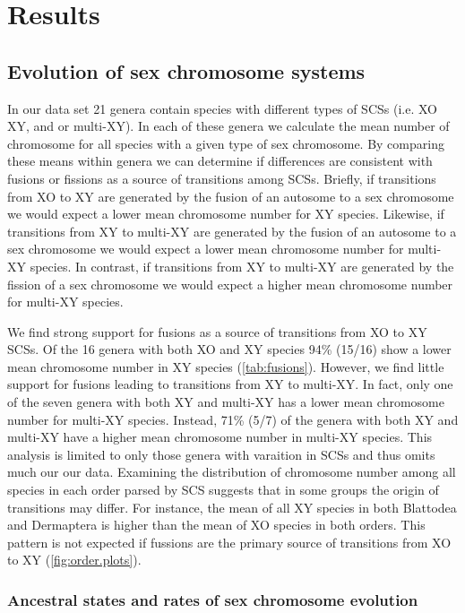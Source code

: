 \section{Results}

\subsection{Evolution of sex chromosome systems}
In our data set 21 genera contain species with different types of SCSs (i.e. XO XY, and or multi-XY).
In each of these genera we calculate the mean number of chromosome for all species with a given type of sex chromosome.
By comparing these means within genera we can determine if differences are consistent with fusions or fissions as a source of transitions among SCSs.
Briefly, if transitions from XO to XY are generated by the fusion of an autosome to a sex chromosome we would expect a lower mean chromosome number for XY species.
Likewise, if transitions from XY to multi-XY are generated by the fusion of an autosome to a sex chromosome we would expect a lower mean chromosome number for multi-XY species.
In contrast, if transitions from XY to multi-XY are generated by the fission of a sex chromosome we would expect a higher mean chromosome number for multi-XY species.

We find strong support for fusions as a source of transitions from XO to XY SCSs.
Of the 16 genera with both XO and XY species 94\% (15/16) show a lower mean chromosome number in XY species (\cref{tab:fusions}). 
However, we find little support for fusions leading to transitions from XY to multi-XY.
In fact, only one of the seven genera with both XY and multi-XY has a lower mean chromosome number for multi-XY species.
Instead, 71\% (5/7) of the genera with both XY and multi-XY have a higher mean chromosome number in multi-XY species.
This analysis is limited to only those genera with varaition in SCSs and thus omits much our our data.
Examining the distribution of chromosome number among all species in each order parsed by SCS suggests that in some groups the origin of transitions may differ.
For instance, the mean of all XY species in both Blattodea and Dermaptera is higher than the mean of XO species in both orders.
This pattern is not expected if fussions are the primary source of transitions from XO to XY (\cref{fig:order.plots}).

\subsubsection{Ancestral states and rates of sex chromosome evolution}

